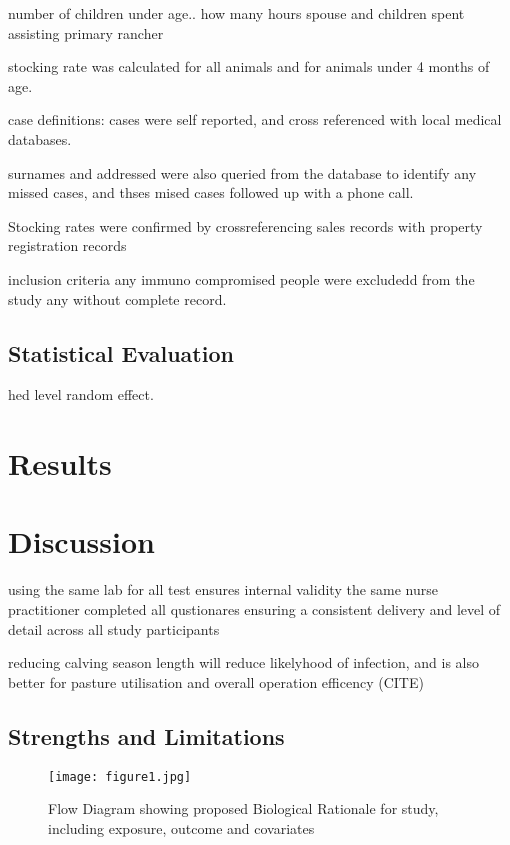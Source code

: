 \documentclass[12pt]{article}
\begin{document}
		number of children under age..
		how many hours spouse and children spent assisting primary rancher 
		
		stocking rate was calculated for all animals and for animals under 4 months of age.	%

		case definitions:
		cases were self reported, and cross referenced with local medical databases.
		
		surnames and addressed were also queried from the database to identify any missed cases, and thses mised cases followed up with a phone call.
		



		Stocking rates were confirmed by crossreferencing sales records with property registration records
		
		inclusion criteria
			any immuno compromised people were excludedd from the study
			any without complete record.

	\subsection{Statistical Evaluation}
		hed level random effect.

	\section{Results}
	

	\section{Discussion}


		using the same lab for all test ensures internal validity
		the same nurse practitioner completed all qustionares ensuring a consistent delivery and level of detail across all study participants
		

		reducing calving season length will reduce likelyhood of infection, and is also better for pasture utilisation and overall operation efficency (CITE)	

	\subsection{Strengths and Limitations}

\begin{figure*}[h!]
	\centering
	\texttt{[image: figure1.jpg]}
	\caption{Flow Diagram showing proposed Biological Rationale for study, including exposure, outcome and covariates }
	\label{fig:1}
\end{figure*}
\end{document}
